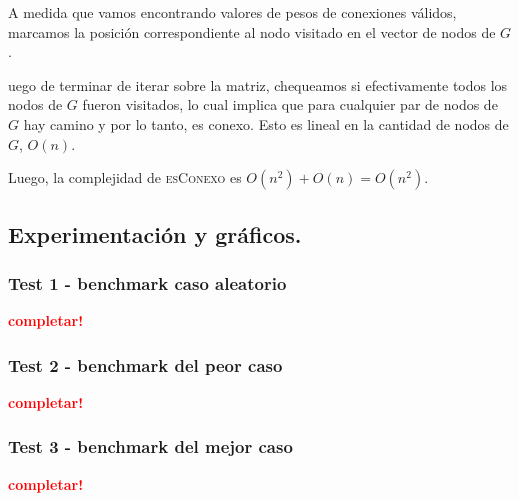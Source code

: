 A medida que vamos encontrando valores de pesos de conexiones válidos, marcamos la posición
correspondiente al nodo visitado en el vector de nodos de $G$.

uego de terminar de iterar sobre la matriz, chequeamos si efectivamente todos los nodos de $G$
fueron visitados, lo cual implica que para cualquier par de nodos de $G$ hay camino y por lo
tanto, es conexo. Esto es lineal en la cantidad de nodos de $G$, $O(n)$.

Luego, la complejidad de \textsc{esConexo} es $O(n^2) + O(n) = O(n^2)$.

\newpage
\subsection{Experimentación y gráficos.}

\vspace*{0.3cm}

\subsubsection{Test 1 - benchmark caso aleatorio}

\textcolor{red}{\textbf{completar!}}


\newpage
\subsubsection{Test 2 - benchmark del peor caso}

\textcolor{red}{\textbf{completar!}}


\newpage
\subsubsection{Test 3 - benchmark del mejor caso}

\textcolor{red}{\textbf{completar!}}
